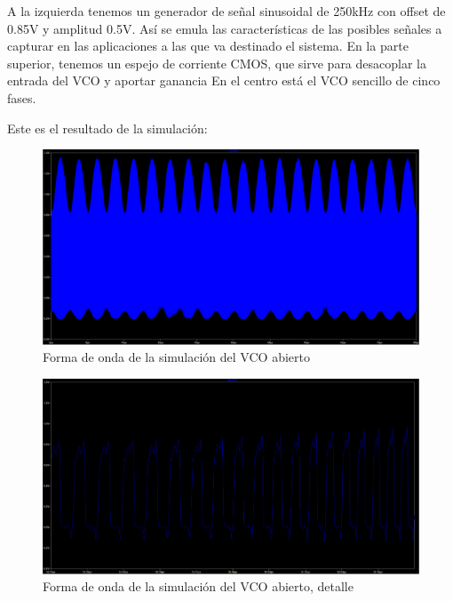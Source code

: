 \documentclass[12pt]{report} %
\begin{document}
	A la izquierda tenemos un generador de señal sinusoidal de 250kHz con offset de 0.85V y amplitud 0.5V. Así se emula las características de las posibles señales a capturar en las aplicaciones a las que va destinado el sistema. En la parte superior, tenemos un espejo de corriente CMOS, que sirve para desacoplar la entrada del VCO y aportar ganancia %
	En el centro está el VCO sencillo de cinco fases. %
	
	Este es el resultado de la simulación:
	
	\begin{figure}[H]
		\includegraphics[width=\textwidth]{ltspice-vco-open-wf.png}
		\caption[Forma de onda de la simulación del VCO abierto]{Forma de onda de la simulación del VCO abierto}
		\label{fig:ltspice-vco-open-wf.png}
	\end{figure}

	\begin{figure}[H]
		\includegraphics[width=\textwidth]{ltspice-vco-open-wf-zoom.png}
		\caption[Forma de onda de la simulación del VCO abierto, detalle]{Forma de onda de la simulación del VCO abierto, detalle}
		\label{fig:ltspice-vco-open-wf-zoom.png}
	\end{figure}
	
\end{document}
